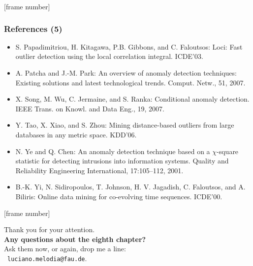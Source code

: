 \documentclass[aspectratio=169,t,xcolor=dvipsnames]{beamer}
\begin{document}
{
  [frame number]
  \begin{frame}
	\frametitle{References (5)}
	\begin{itemize}
		\item S. Papadimitriou, H. Kitagawa, P.B. Gibbons, and C. Faloutsos: Loci: Fast outlier detection using the local correlation integral. ICDE'03.
		\item A. Patcha and J.-M. Park: An overview of anomaly detection techniques: Existing solutions and latest technological trends. Comput. Netw., 51, 2007.
		\item X. Song, M. Wu, C. Jermaine, and S. Ranka: Conditional anomaly detection. IEEE Trans. on Knowl. and Data Eng., 19, 2007.
		\item Y. Tao, X. Xiao, and S. Zhou: Mining distance-based outliers from large databases in any metric space. KDD'06.
		\item N. Ye and Q. Chen: An anomaly detection technique based on a $\chi$-square statistic for detecting intrusions into information systems. Quality and 			Reliability Engineering International, 17:105–112, 2001.
		\item B.-K. Yi, N. Sidiropoulos, T. Johnson, H. V. Jagadish, C. Faloutsos, and A. Biliris: Online data mining for co-evolving time sequences. ICDE'00.
	\end{itemize}
\end{frame}
}

{ %
  [frame number]
  \begin{frame}[c]
    \begin{center}
      Thank you for your attention.\\
      {\bf Any questions about the eighth chapter?}\\[0.5cm]
      Ask them now, or again, drop me a line: \\
      \faSendO \ \texttt{luciano.melodia@fau.de}.
    \end{center}
  \end{frame}
}
\end{document}
